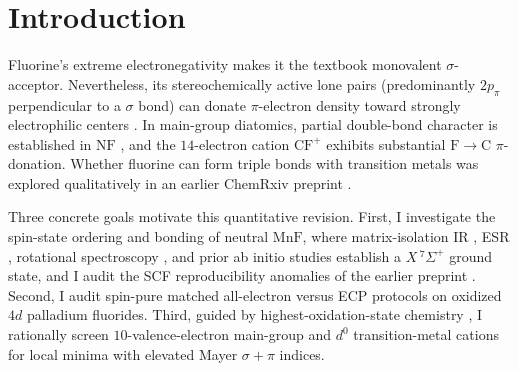 \documentclass[10pt,twocolumn]{article}
\begin{document}
\section{Introduction}
Fluorine's extreme electronegativity makes it the textbook monovalent $\sigma$-acceptor. Nevertheless, its stereochemically active lone pairs (predominantly $2p_\pi$ perpendicular to a $\sigma$ bond) can donate $\pi$-electron density toward strongly electrophilic centers \cite{frenking2000}. In main-group diatomics, partial double-bond character is established in $\mathrm{NF}$ \cite{harbison2002}, and the $14$-electron cation $\mathrm{CF}^+$ exhibits substantial $\mathrm{F}\to\mathrm{C}$ $\pi$-donation. Whether fluorine can form triple bonds with transition metals was explored qualitatively in an earlier ChemRxiv preprint \cite{kleber2025}.

Three concrete goals motivate this quantitative revision. First, I investigate the spin-state ordering and bonding of neutral $\mathrm{MnF}$, where matrix-isolation IR \cite{brosi2016}, ESR \cite{devore1978}, rotational spectroscopy \cite{sheridan2003}, and prior ab initio studies \cite{koukounas2004} establish a $X\,^7\Sigma^+$ ground state, and I audit the SCF reproducibility anomalies of the earlier preprint \cite{seeger1977}. Second, I audit spin-pure matched all-electron versus ECP protocols \cite{weigend2005,pyykko2012,peterson2007} on oxidized $4d$ palladium fluorides. Third, guided by highest-oxidation-state chemistry \cite{riedel2009}, I rationally screen $10$-valence-electron main-group and $d^0$ transition-metal cations for local minima with elevated Mayer $\sigma+\pi$ indices.
\end{document}
